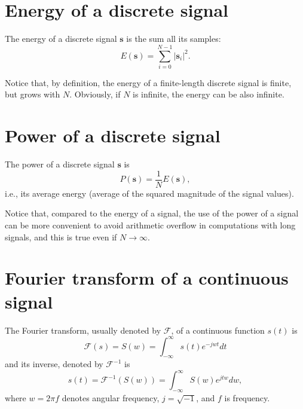 

\section{Energy of a discrete signal}
\label{sec:energy_signal}

The energy of a discrete signal $\mathbf{s}$ is the sum all its samples:
\begin{equation}
  E(\mathbf{s}) = \sum_{i=0}^{N-1}|\mathbf{s}_i|^2.
\end{equation}

Notice that, by definition, the energy of a finite-length discrete
signal is finite, but grows with $N$. Obviously, if $N$ is infinite,
the energy can be also infinite.


\section{Power of a discrete signal}
\label{sec:power_signal}

The power of a discrete signal $\mathbf{s}$ is
\begin{equation}
  P(\mathbf{s}) = \frac{1}{N}E(\mathbf{s}),
\end{equation}
i.e., its average energy (average of the squared magnitude of the
signal values).

Notice that, compared to the energy of a signal, the use of the power
of a signal can be more convenient to avoid arithmetic overflow in
computations with long signals, and this is true even if
$N\rightarrow\infty$.


\section{Fourier transform of a continuous signal}
\label{sec:Fourier_transform}

The Fourier transform, usually denoted by $\mathcal{F}$, of a
continuous function $s(t)$ is
\begin{equation}
  \mathcal{F}(s) = S(w) = \int_{-\infty}^{\infty}s(t)e^{-jwt}dt
  \label{eq:FT}
\end{equation}
and its inverse, denoted by $\mathcal{F}^{-1}$ is
\begin{equation}
  s(t) = \mathcal{F}^{-1}(S(w)) = \int_{-\infty}^{\infty}S(w)e^{jtw}dw,
\end{equation}
where $w=2\pi f$ denotes angular frequency, $j=\sqrt{-1}$, and
$f$ is frequency.

